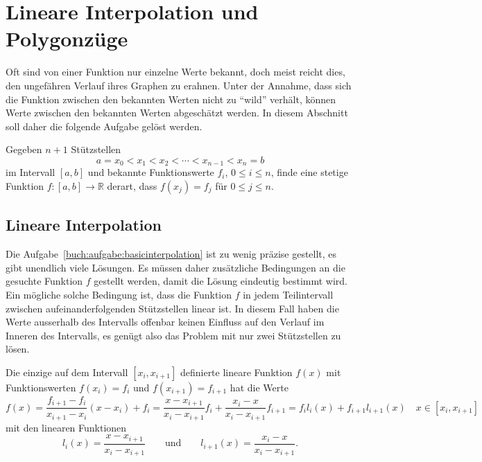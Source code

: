 %
%
%
\section{Lineare Interpolation und Polygonzüge
\label{buch:section:lineareinterpolation}}
Oft sind von einer Funktion nur einzelne Werte bekannt, doch meist reicht
dies, den ungefähren Verlauf ihres Graphen zu erahnen.
Unter der Annahme, dass sich die Funktion zwischen den bekannten Werten
nicht zu ``wild'' verhält, können Werte zwischen den bekannten Werten
abgeschätzt werden.
In diesem Abschnitt soll daher die folgende Aufgabe gelöst werden.

\begin{aufgabe}
\label{buch:aufgabe:basicinterpolation}
Gegeben $n+1$ Stützstellen 
\[
a=x_0<x_1<x_2<\cdots<x_{n-1}<x_n=b
\]
im Intervall $[a,b]$ und bekannte Funktionswerte $f_i$, $0\le i\le n$,
finde eine stetige Funktion $f\colon[a,b]\to \mathbb R$ derart, dass
$f(x_j)=f_j$ für $0\le j\le n$.
\end{aufgabe}

\subsection{Lineare Interpolation
\label{buch:subsection:lineareinterpolation}}
Die Aufgabe~\eqref{buch:aufgabe:basicinterpolation} ist zu wenig präzise
gestellt, es gibt unendlich viele Lösungen.
Es müssen daher zusätzliche Bedingungen an die gesuchte Funktion $f$
gestellt werden, damit die Lösung eindeutig bestimmt wird.
Ein mögliche solche Bedingung ist, dass die Funktion $f$ in jedem
Teilintervall zwischen aufeinanderfolgenden Stützstellen linear ist.
In diesem Fall haben die Werte ausserhalb des Intervalls offenbar 
keinen Einfluss auf den Verlauf im Inneren des Intervalls, es genügt
also das Problem mit nur zwei Stützstellen zu lösen.

\begin{satz}
\label{buch:satz:lineareinterpolation}
Die einzige auf dem Intervall $[x_i,x_{i+1}]$ definierte lineare Funktion 
$f(x)$ mit Funktionswerten $f(x_i)=f_i$ und $f(x_{i+1}) = f_{i+1}$
hat die Werte
\begin{equation}
f(x)
=
\frac{f_{i+1}-f_i}{x_{i+1}-x_i} (x-x_i) + f_i
=
\frac{x-x_{i+1}}{x_i-x_{i+1}} f_i
+
\frac{x_{i}-x}{x_i-x_{i+1}} f_{i+1}
=
f_il_i(x) + f_{i+1}l_{i+1}(x)
\quad x\in[x_i,x_{i+1}]
\label{buch:eqn:lineareinterpolation}
\end{equation}
mit den linearen Funktionen
\[
l_i(x) = \frac{x-x_{i+1}}{x_i-x_{i+1}}
\qquad\text{und}\qquad
l_{i+1}(x) = \frac{x_i-x}{x_i-x_{i+1}}.
\]
\end{satz}

